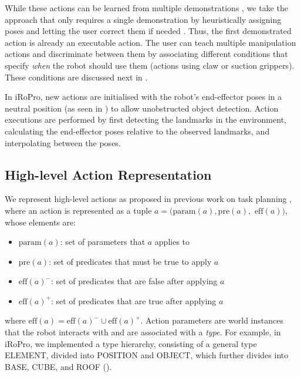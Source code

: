 While these actions can be learned from multiple demonstrations \cite{niekum2012learning}, we take the approach that only requires a single demonstration by heuristically assigning poses and letting the user correct them if needed \cite{alexandrova2014robot}.
Thus, the first demonstrated action is already an executable action.
The user can teach multiple manipulation actions and discriminate between them by associating different conditions that specify \textit{when} the robot should use them (\eg actions using claw or suction grippers).
These conditions are discussed next in .

In iRoPro, new actions are initialised with the robot's end-effector poses in a neutral position (as seen in ) to allow unobstructed object detection.
Action executions are performed by first detecting the landmarks in the environment, calculating the end-effector poses relative to the observed landmarks, and interpolating between the poses.



\subsection{High-level Action Representation}
\label{sec:highlevel}
We represent high-level actions as proposed in previous work on task planning \cite{ghallab2004automated}, where an action is represented as a tuple $a = (\text{param}(a), \text{pre}(a),$ $\text{eff}(a))$, whose elements are:
\begin{itemize}
\item $\text{param}(a)$: set of parameters that $a$ applies to
\item $\text{pre}(a)$: set of predicates that must be true to apply $a$
\item $\text{eff}(a)^{-}$: set of predicates that are false after applying $a$
\item $\text{eff}(a)^{+}$: set of predicates that are true after applying $a$
\end{itemize}
where $\text{eff}(a) = \text{eff}(a)^{-} \cup \text{eff}(a)^{+}$. 
Action parameters are world instances that the robot interacts with and are associated with a \textit{type}.
For example, in iRoPro, we implemented a type hierarchy, consisting of a general type ELEMENT, divided into POSITION and OBJECT, which further divides into BASE, CUBE, and ROOF ().

